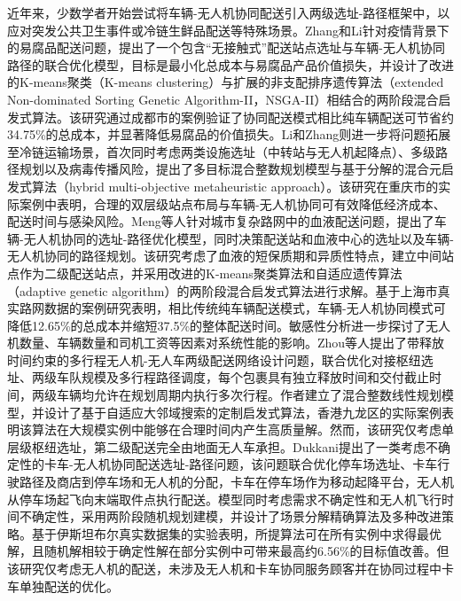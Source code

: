 \documentclass[fontset=none]{ctexart}
\begin{document}
近年来，少数学者开始尝试将车辆-无人机协同配送引入两级选址-路径框架中，以应对突发公共卫生事件或冷链生鲜品配送等特殊场景。Zhang和Li针对疫情背景下的易腐品配送问题，提出了一个包含“无接触式”配送站点选址与车辆-无人机协同路径的联合优化模型，目标是最小化总成本与易腐品产品价值损失，并设计了改进的K-means聚类（K-means clustering）与扩展的非支配排序遗传算法（extended Non-dominated Sorting Genetic Algorithm-II，NSGA-II）相结合的两阶段混合启发式算法\cite{zhangCollaborativeVehicledroneDistribution2023}。该研究通过成都市的案例验证了协同配送模式相比纯车辆配送可节省约34.75\%的总成本，并显著降低易腐品的价值损失。Li和Zhang则进一步将问题拓展至冷链运输场景\cite{liMultiechelonLocationRouting2026}，首次同时考虑两类设施选址（中转站与无人机起降点）、多级路径规划以及病毒传播风险，提出了多目标混合整数规划模型与基于分解的混合元启发式算法（hybrid multi-objective metaheuristic approach）。该研究在重庆市的实际案例中表明，合理的双层级站点布局与车辆-无人机协同可有效降低经济成本、配送时间与感染风险。Meng等人针对城市复杂路网中的血液配送问题\cite{mengLocationroutingOptimizationUAV2024}，提出了车辆-无人机协同的选址-路径优化模型，同时决策配送站和血液中心的选址以及车辆-无人机协同的路径规划。该研究考虑了血液的短保质期和异质性特点，建立中间站点作为二级配送站点，并采用改进的K-means聚类算法和自适应遗传算法（adaptive genetic algorithm）的两阶段混合启发式算法进行求解。基于上海市真实路网数据的案例研究表明，相比传统纯车辆配送模式，车辆-无人机协同模式可降低12.65\%的总成本并缩短37.5\%的整体配送时间。敏感性分析进一步探讨了无人机数量、车辆数量和司机工资等因素对系统性能的影响。Zhou等人提出了带释放时间约束的多行程无人机-无人车两级配送网络设计问题\cite{zhouMultitripUAVUGVDelivery2025}，联合优化对接枢纽选址、两级车队规模及多行程路径调度，每个包裹具有独立释放时间和交付截止时间，两级车辆均允许在规划周期内执行多次行程。作者建立了混合整数线性规划模型，并设计了基于自适应大邻域搜索的定制启发式算法，香港九龙区的实际案例表明该算法在大规模实例中能够在合理时间内产生高质量解。然而，该研究仅考虑单层级枢纽选址，第二级配送完全由地面无人车承担。Dukkani提出了一类考虑不确定性的卡车-无人机协同配送选址-路径问题\cite{dukkanciTruckDroneDelivery2026}，该问题联合优化停车场选址、卡车行驶路径及商店到停车场和无人机的分配，卡车在停车场作为移动起降平台，无人机从停车场起飞向末端取件点执行配送。模型同时考虑需求不确定性和无人机飞行时间不确定性，采用两阶段随机规划建模，并设计了场景分解精确算法及多种改进策略。基于伊斯坦布尔真实数据集的实验表明，所提算法可在所有实例中求得最优解，且随机解相较于确定性解在部分实例中可带来最高约6.56\%的目标值改善。但该研究仅考虑无人机的配送，未涉及无人机和卡车协同服务顾客并在协同过程中卡车单独配送的优化。
\end{document}
